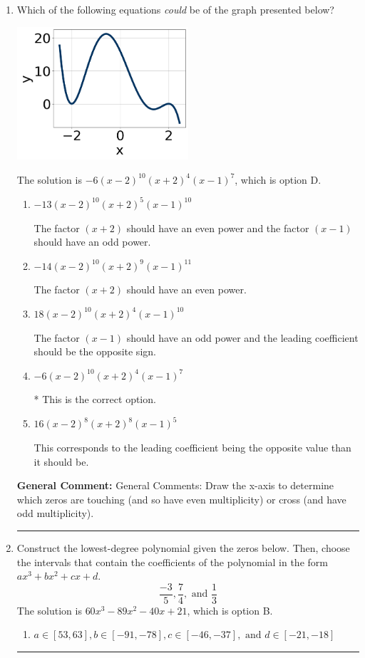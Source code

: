 \documentclass{extbook}[14pt]
\newcommand{\litem}[1]{\item #1

\rule{\textwidth}{0.4pt}}
\begin{document}
\begin{enumerate}\litem{
Which of the following equations \textit{could} be of the graph presented below?

\begin{center}
    \includegraphics[width=0.5\textwidth]{../Figures/polyGraphToFunctionC.png}
\end{center}


The solution is \( -6(x - 2)^{10} (x + 2)^{4} (x - 1)^{7} \), which is option D.\begin{enumerate}[label=\Alph*.]
\item \( -13(x - 2)^{10} (x + 2)^{5} (x - 1)^{10} \)

The factor $(x + 2)$ should have an even power and the factor $(x - 1)$ should have an odd power.
\item \( -14(x - 2)^{10} (x + 2)^{9} (x - 1)^{11} \)

The factor $(x + 2)$ should have an even power.
\item \( 18(x - 2)^{10} (x + 2)^{4} (x - 1)^{10} \)

The factor $(x - 1)$ should have an odd power and the leading coefficient should be the opposite sign.
\item \( -6(x - 2)^{10} (x + 2)^{4} (x - 1)^{7} \)

* This is the correct option.
\item \( 16(x - 2)^{8} (x + 2)^{8} (x - 1)^{5} \)

This corresponds to the leading coefficient being the opposite value than it should be.
\end{enumerate}

\textbf{General Comment:} General Comments: Draw the x-axis to determine which zeros are touching (and so have even multiplicity) or cross (and have odd multiplicity).
}
\litem{
Construct the lowest-degree polynomial given the zeros below. Then, choose the intervals that contain the coefficients of the polynomial in the form $ax^3+bx^2+cx+d$.
\[ \frac{-3}{5}, \frac{7}{4}, \text{ and } \frac{1}{3} \]The solution is \( 60x^{3} -89 x^{2} -40 x + 21 \), which is option B.\begin{enumerate}[label=\Alph*.]
\item \( a \in [53, 63], b \in [-91, -78], c \in [-46, -37], \text{ and } d \in [-21, -18] \)


\end{enumerate}}
\end{enumerate}
\end{document}
